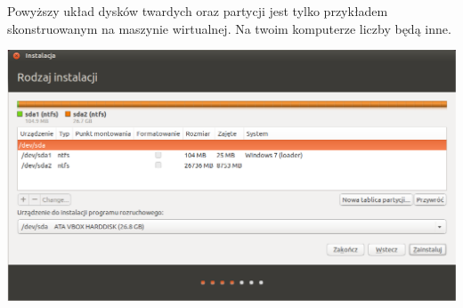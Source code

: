 Powyższy układ dysków twardych oraz partycji jest tylko przykładem skonstruowanym na maszynie wirtualnej. Na twoim komputerze liczby będą inne.
\clearpage
\begin{center}
        \includegraphics[width=\linewidth]{images/instalator_partycjonowanie_gparted2_czysty.png}
\end{center}

